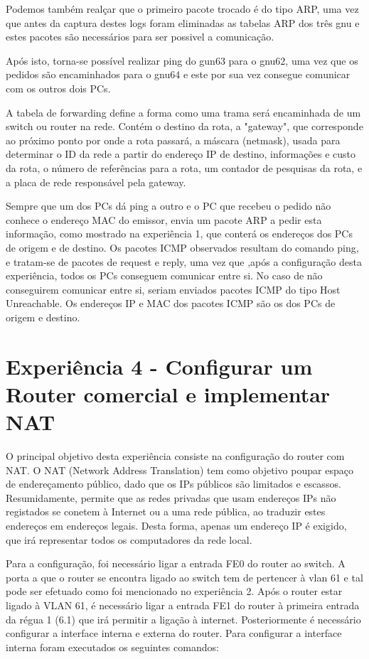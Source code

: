 \documentclass[article, a4paper, 11pt, oneside]{memoir}
\begin{document}
Podemos também realçar que o primeiro pacote trocado é do tipo ARP, uma vez que antes da captura destes logs foram eliminadas as tabelas ARP dos três gnu e estes pacotes são necessários
para ser possivel a comunicação.

Após isto, torna-se possível realizar ping do gun63 para o gnu62, uma vez que os pedidos são encaminhados para o gnu64 e este por sua vez consegue comunicar com os outros dois PCs.

A tabela de forwarding define a forma como uma trama será encaminhada de um switch ou router na rede. Contém o destino da rota, a "gateway", que corresponde ao próximo ponto por onde a rota passará,
a máscara (netmask), usada para determinar o ID da rede a partir do endereço IP de destino, informações e custo da rota, o número de referências para a rota, um contador de pesquisas da rota, e a placa de rede responsável pela gateway.

Sempre que um dos PCs dá ping a outro e o PC que recebeu o pedido não conhece o endereço MAC do emissor, envia um pacote ARP a pedir esta informação, como mostrado na experiência 1, que conterá os endereços dos PCs de origem e de destino.
Os pacotes ICMP observados resultam do comando ping, e tratam-se de pacotes de request e reply, uma vez que ,após a configuração desta experiência, todos os PCs conseguem comunicar entre si.
No caso de não conseguirem comunicar entre si, seriam enviados pacotes ICMP do tipo Host Unreachable.
Os endereços IP e MAC dos pacotes ICMP são os dos PCs de origem e destino.

\section{Experiência 4 - Configurar um Router comercial e implementar NAT}

O principal objetivo desta experiência consiste na configuração do router com NAT.
O NAT (Network Address Translation) tem como objetivo poupar espaço de endereçamento público, dado que os IPs públicos são limitados e escassos.
Resumidamente, permite que as redes privadas que usam endereços IPs não registados se conetem à Internet ou a uma rede pública, ao traduzir estes endereços em endereços legais. 
Desta forma, apenas um endereço IP é exigido, que irá representar todos os computadores da rede local.
 
Para a configuração, foi necessário ligar a entrada FE0 do router ao switch. A porta a que o router se encontra ligado ao switch tem de pertencer à vlan 61 e tal pode ser efetuado como foi
mencionado no experiência 2. Após o router estar ligado à VLAN 61, é necessário ligar a entrada FE1 do router à primeira entrada da régua 1 (6.1) que irá permitir a ligação à internet.
Posteriormente é necessário configurar a interface interna e externa do router. Para configurar a interface interna foram executados os seguintes comandos:
\end{document}
